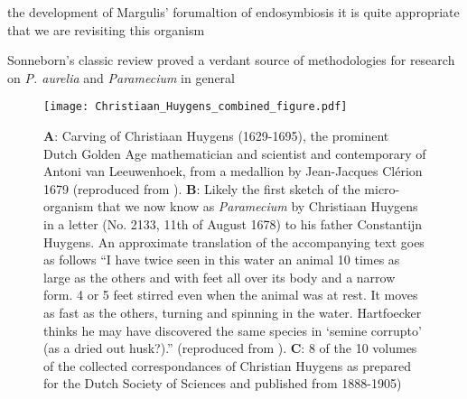 the development of Margulis' forumaltion of endosymbiosis \citep{Margulis1998} it is
quite appropriate that we are revisiting this organism

Sonneborn's classic review \citep{Sonneborn1950} proved a verdant source of methodologies
for research on  \textit{P. aurelia} and \textit{Paramecium} in general






\begin{figure}[h!]
    \caption{\textbf{A}: Carving of Christiaan Huygens (1629-1695), the prominent Dutch Golden Age mathematician and scientist and contemporary of Antoni van Leeuwenhoek, from a medallion by Jean-Jacques Cl\'erion 1679 (reproduced from \citep{Huygens}). \textbf{B}: Likely the first sketch of the micro-organism that we now know as \textit{Paramecium} by Christiaan Huygens in a letter (No. 2133, 11th of August 1678) to his father Constantijn Huygens. An approximate translation of the accompanying text goes as follows ``I have twice seen in this water an animal 10 times as large as the others and with feet all over its body and a narrow form. 4 or 5 feet stirred even when the animal was at rest. It moves as fast as the others, turning and spinning in the water. Hartfoecker thinks he may have discovered the same species in `semine corrupto' (as a dried out husk?).'' (reproduced from \citep{Huygens}). \textbf{C}: 8 of the 10 volumes of the collected correspondances of Christian Huygens as prepared for the Dutch Society of Sciences and published from 1888-1905)}
\texttt{[image: Christiaan\_Huygens\_combined\_figure.pdf]}
\end{figure}











